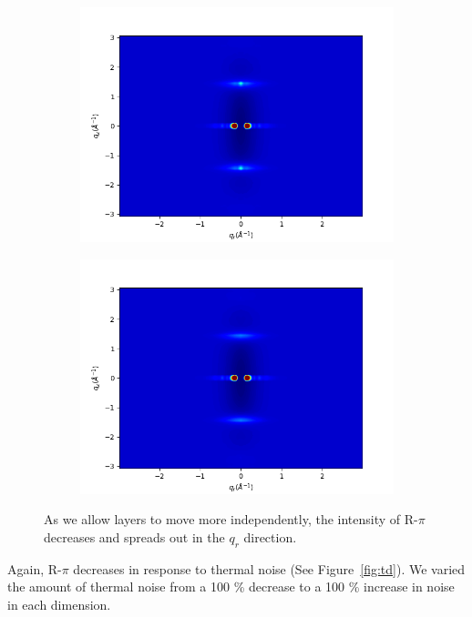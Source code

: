 \documentclass{article}
\begin{document}
\begin{figure}
\begin{subfigure}{0.45\textwidth}
  \includegraphics[width=\textwidth]{rzplot_ld66.png}
  \caption{}\label{fig:rzplot_ld66}
  \end{subfigure}
  \begin{subfigure}{0.45\textwidth} 
  \includegraphics[width=\textwidth]{rzplot_ld1.png}
  \caption{}\label{fig:rzplot_ld1}
  \end{subfigure}
  \caption{As we allow layers to move more independently, the intensity of
  R-$\pi$ decreases and spreads out in the $q_r$ direction.}\label{fig:rzplots}
  \end{figure}

  Again, R-$\pi$ decreases in response to thermal noise (See 
  Figure~\ref{fig:td}). We varied the amount of thermal noise from a 100 \%
  decrease to a 100 \% increase in noise in each dimension.
\end{document}
